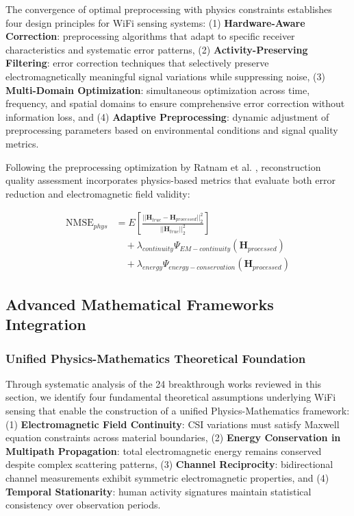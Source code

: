 \documentclass[journal]{IEEEtran}
\begin{document}
The convergence of optimal preprocessing with physics constraints establishes four design principles for WiFi sensing systems: (1) \textbf{Hardware-Aware Correction}: preprocessing algorithms that adapt to specific receiver characteristics and systematic error patterns, (2) \textbf{Activity-Preserving Filtering}: error correction techniques that selectively preserve electromagnetically meaningful signal variations while suppressing noise, (3) \textbf{Multi-Domain Optimization}: simultaneous optimization across time, frequency, and spatial domains to ensure comprehensive error correction without information loss, and (4) \textbf{Adaptive Preprocessing}: dynamic adjustment of preprocessing parameters based on environmental conditions and signal quality metrics.

Following the preprocessing optimization by Ratnam et al. \cite{ratnam2024optimal}, reconstruction quality assessment incorporates physics-based metrics that evaluate both error reduction and electromagnetic field validity:

\begin{align}
\text{NMSE}_{phys} &= E\left[\frac{||\mathbf{H}_{true} - \mathbf{H}_{processed}||_2^2}{||\mathbf{H}_{true}||_2^2}\right] \nonumber \\
&\quad + \lambda_{continuity} \Psi_{EM-continuity}(\mathbf{H}_{processed}) \nonumber \\
&\quad + \lambda_{energy} \Psi_{energy-conservation}(\mathbf{H}_{processed})
\label{eq:nmse_physics}
\end{align}

\subsection{Advanced Mathematical Frameworks Integration}

\subsubsection{Unified Physics-Mathematics Theoretical Foundation}

Through systematic analysis of the 24 breakthrough works reviewed in this section, we identify four fundamental theoretical assumptions underlying WiFi sensing that enable the construction of a unified Physics-Mathematics framework: (1) \textbf{Electromagnetic Field Continuity}: CSI variations must satisfy Maxwell equation constraints across material boundaries, (2) \textbf{Energy Conservation in Multipath Propagation}: total electromagnetic energy remains conserved despite complex scattering patterns, (3) \textbf{Channel Reciprocity}: bidirectional channel measurements exhibit symmetric electromagnetic properties, and (4) \textbf{Temporal Stationarity}: human activity signatures maintain statistical consistency over observation periods.
\end{document}

